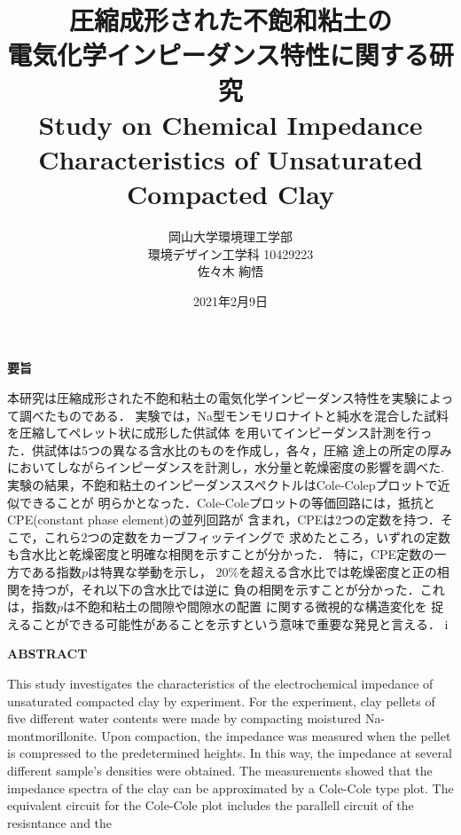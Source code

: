 \documentclass[11pt,a4j]{mybook2}
\title{
\vspace{20mm}
圧縮成形された不飽和粘土の\\
電気化学インピーダンス特性に関する研究
\\
\vspace{5mm}
Study on Chemical Impedance Characteristics 
of Unsaturated Compacted Clay
\vspace{60mm}
}
\date{2021年2月9日}
\author{
	\vspace{40mm}
岡山大学環境理工学部\\
環境デザイン工学科 10429223\\
	佐々木 絢悟
}
\begin{document}
\maketitle
\begin{center}
\begin{minipage}{15cm}
\begin{center}
	{\bf 要旨}
\end{center}
本研究は圧縮成形された不飽和粘土の電気化学インピーダンス特性を実験によって調べたものである．
実験では，Na型モンモリロナイトと純水を混合した試料を圧縮してペレット状に成形した供試体
を用いてインピーダンス計測を行った．供試体は5つの異なる含水比のものを作成し，各々，圧縮
途上の所定の厚みにおいてしながらインピーダンスを計測し，水分量と乾燥密度の影響を調べた.
実験の結果，不飽和粘土のインピーダンススペクトルはCole-Colepプロットで近似できることが
明らかとなった．Cole-Coleプロットの等価回路には，抵抗とCPE(constant phase element)の並列回路が
含まれ，CPEは2つの定数を持つ．そこで，これら2つの定数をカーブフィッテイングで
求めたところ，いずれの定数も含水比と乾燥密度と明確な相関を示すことが分かった．
特に，CPE定数の一方である指数$p$は特異な挙動を示し，
$20\%$を超える含水比では乾燥密度と正の相関を持つが，それ以下の含水比では逆に
負の相関を示すことが分かった．これは，指数$p$は不飽和粘土の間隙や間隙水の配置
に関する微視的な構造変化を
捉えることができる可能性があることを示すという意味で重要な発見と言える．
i%
	\vspace{15mm}
\begin{center}
	{\bf ABSTRACT}
\end{center}
This study investigates the characteristics of the electrochemical impedance of unsaturated compacted clay by experiment.
For the experiment, clay pellets of five different water contents were made by compacting moistured Na-montmorillonite.
Upon compaction, the impedance was measured when the pellet is compressed to the predetermined heights. 
In this way, the impedance at several different sample's densities were obtained.
The measurements showed that the impedance spectra of the clay can be approximated by a Cole-Cole type plot.
The equivalent circuit for the Cole-Cole plot includes the parallell circuit of the resisntance and the 

\end{minipage}
\end{center}
\end{document}
